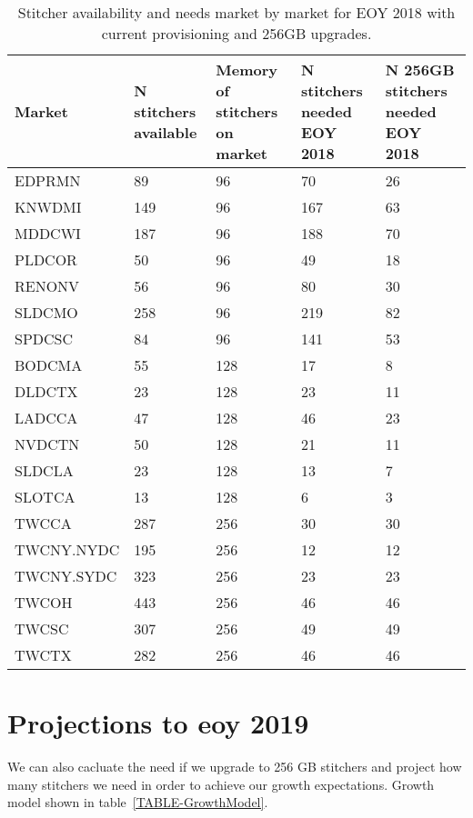 \documentclass{article}
\begin{document}
\begin{table}
\begin{tabular}{|l|p{17mm}|p{17mm}|p{17mm}|p{17mm}|} 
\hline Market & N stitchers available & Memory of stitchers on market & N stitchers needed EOY 2018 & N 256GB stitchers needed EOY 2018 \\
\hline EDPRMN & 89 & 96 & 70 & 26 \\
\rowcolor{orange}\hline KNWDMI & 149 & 96 & 167 & 63 \\
\rowcolor{orange}\hline MDDCWI & 187 & 96 & 188 & 70 \\
\rowcolor{yellow}\hline PLDCOR & 50 & 96 & 49 & 18 \\
\rowcolor{orange}\hline RENONV & 56 & 96 & 80 & 30 \\
\hline SLDCMO & 258 & 96 & 219 & 82  \\
\rowcolor{orange}\hline SPDCSC & 84 & 96 & 141 & 53 \\
\hline BODCMA & 55 & 128 & 17 & 8  \\
\rowcolor{yellow}\hline DLDCTX & 23 & 128 & 23 & 11 \\
\rowcolor{yellow}\hline LADCCA & 47 & 128 & 46 & 23 \\
\hline NVDCTN & 50 & 128 & 21 & 11  \\
\hline SLDCLA & 23 & 128 & 13 & 7 \\
\hline SLOTCA & 13 & 128 & 6 & 3 \\
\hline TWCCA & 287 & 256 & 30 & 30 \\
\hline TWCNY.NYDC & 195 & 256 & 12 & 12 \\
\hline TWCNY.SYDC & 323 & 256 & 23 & 23 \\
\hline TWCOH & 443 & 256 & 46 & 46 \\
\hline TWCSC & 307 & 256 & 49 & 49 \\
\hline TWCTX & 282 & 256 & 46 & 46 \\
\hline 
\end{tabular}
\caption{\label{TABLE-StitchersNeeded2018}Stitcher availability and needs market by market for EOY 2018 with current provisioning and 256GB upgrades.} 
\end{table}

\section{Projections to eoy 2019}
\label{SECTION-2019Proj}

We can also cacluate the need if we upgrade to 256 GB stitchers and project how many stitchers we need in order to achieve our growth expectations. Growth model shown in table~\ref{TABLE-GrowthModel}. 
\end{document}
